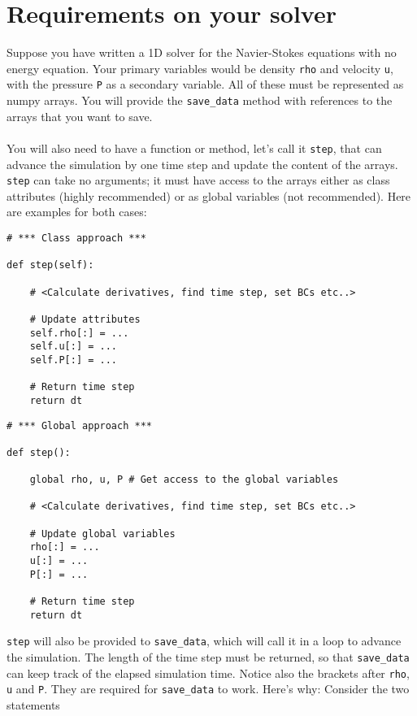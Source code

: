 \documentclass{article}
\newcommand{\ttt}[1]{\texttt{#1}}
\begin{document}
\section{Requirements on your solver}
\label{sec:req}
Suppose you have written a 1D solver for the Navier-Stokes equations with no energy equation. Your primary variables would be density \ttt{rho} and velocity \ttt{u}, with the pressure \ttt{P} as a secondary variable. All of these must be represented as numpy arrays. You will provide the \ttt{save\_data} method with references to the arrays that you want to save.\\\\
You will also need to have a function or method, let's call it \ttt{step}, that can advance the simulation by one time step and update the content of the arrays. \ttt{step} can take no arguments; it must have access to the arrays either as class attributes (highly recommended) or as global variables (not recommended). Here are examples for both cases:\\
\begin{minipage}{\linewidth}
\begin{lstlisting}
# *** Class approach ***

def step(self):

	# <Calculate derivatives, find time step, set BCs etc..>

	# Update attributes
	self.rho[:] = ...
	self.u[:] = ...
	self.P[:] = ...

	# Return time step
	return dt
\end{lstlisting}
\end{minipage}
\begin{minipage}{\linewidth}
\begin{lstlisting}
# *** Global approach ***

def step():

	global rho, u, P # Get access to the global variables

	# <Calculate derivatives, find time step, set BCs etc..>

	# Update global variables
	rho[:] = ...
	u[:] = ...
	P[:] = ...

	# Return time step
	return dt
\end{lstlisting}
\end{minipage}
\ttt{step} will also be provided to \ttt{save\_data}, which will call it in a loop to advance the simulation. The length of the time step must be returned, so that \ttt{save\_data} can keep track of the elapsed simulation time. Notice also the brackets after \ttt{rho}, \ttt{u} and \ttt{P}. They are required for \ttt{save\_data} to work. Here's why: Consider the two statements
\end{document}
